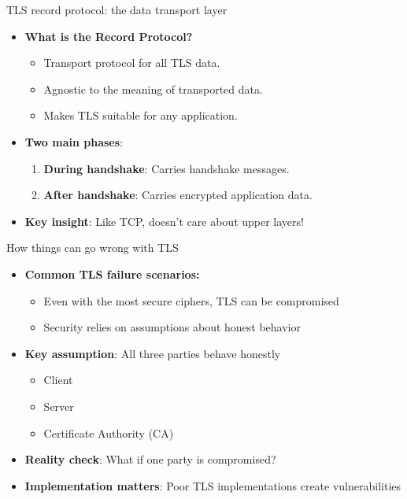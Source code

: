 \ifdefined\PRESENTATION\else\PassOptionsToClass{handout}{beamer}\fi\documentclass[aspectratio=169, lualatex]{beamer}
\begin{document}
\begin{frame}{TLS record protocol: the data transport layer}
	\begin{itemize}[<+->]
		\item \textbf{What is the Record Protocol?}
		      \begin{itemize}
			      \item Transport protocol for all TLS data.
			      \item Agnostic to the meaning of transported data.
			      \item Makes TLS suitable for any application.
		      \end{itemize}
		\item \textbf{Two main phases}:
		      \begin{enumerate}
			      \item \textbf{During handshake}: Carries handshake messages.
			      \item \textbf{After handshake}: Carries encrypted application data.
		      \end{enumerate}
		\item \textbf{Key insight}: Like TCP, doesn't care about upper layers!
	\end{itemize}
\end{frame}

\begin{frame}{How things can go wrong with TLS}
	\begin{itemize}
		\item \textbf{Common TLS failure scenarios:}
		      \begin{itemize}
			      \item Even with the most secure ciphers, TLS can be compromised
			      \item Security relies on assumptions about honest behavior
		      \end{itemize}
		\item \textbf{Key assumption}: All three parties behave honestly
		      \begin{itemize}
			      \item Client
			      \item Server
			      \item Certificate Authority (CA)
		      \end{itemize}
		\item \textbf{Reality check}: What if one party is compromised?
		\item \textbf{Implementation matters}: Poor TLS implementations create vulnerabilities
	\end{itemize}
\end{frame}
\end{document}
